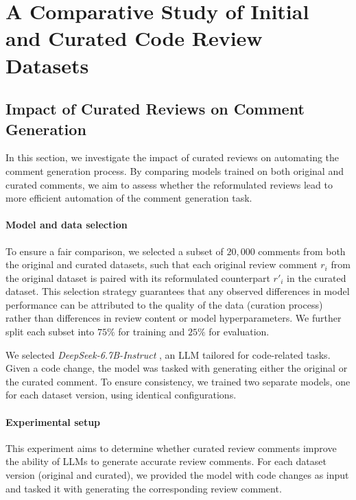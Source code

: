 \section{A Comparative Study of Initial and Curated Code Review Datasets}
\label{sec:analysis}

\subsection{Impact of Curated Reviews on Comment Generation}
\label{subsec:model_data}
In this section, we investigate the impact of curated reviews on automating the comment generation process. By comparing models trained on both original and curated comments, we aim to assess whether the reformulated reviews lead to more efficient automation of the comment generation task.

\paragraph{\textbf{Model and data selection}}
To ensure a fair comparison, we selected a subset of $20,000$ comments from both the original and curated datasets, such that each original review comment \( r_i \) from the original dataset is paired with its reformulated counterpart \( r'_i \) in the curated dataset. This selection strategy guarantees that any observed differences in model performance can be attributed to the quality of the data (\ie curation process) rather than differences in review content or model hyperparameters. We further split each subset into $75\%$ for training and $25\%$ for evaluation.

We selected \textit{DeepSeek-6.7B-Instruct} \cite{deepseek-coder}, an LLM tailored for code-related tasks. 
Given a code change, the model was tasked with generating either the original or the curated comment. To ensure consistency, we trained two separate models, one for each dataset version, using identical configurations.


\paragraph{\textbf{Experimental setup}}

This experiment aims to determine whether curated review comments improve the ability of LLMs to generate accurate review comments. For each dataset version (original and curated), we provided the model with code changes as input and tasked it with generating the corresponding review comment.

